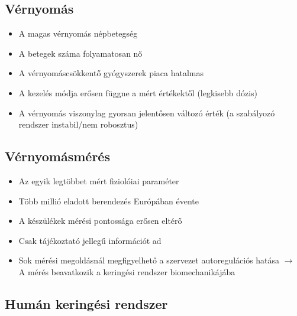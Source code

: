 \subsection{Vérnyomás}
\begin{itemize}
    \item A magas vérnyomás népbetegség
    \item A betegek száma folyamatosan nő
    \item A vérnyomáscsökkentő gyógyszerek piaca hatalmas
    \item A kezelés módja erősen függne a mért értékektől (legkisebb dózis)
    \item A vérnyomás viszonylag gyorsan jelentősen változó érték (a szabályozó rendszer instabil/nem robosztus)
\end{itemize}

\subsection{Vérnyomásmérés}
\begin{itemize}
    \item Az egyik legtöbbet mért fiziolóiai paraméter
    \item Több millió eladott berendezés Európában évente
    \item A készülékek mérési pontossága erősen eltérő
    \item Csak tájékoztató jellegű információt ad
    \item Sok mérési megoldásnál megfigyelhető a szervezet autoregulációs hatása $\rightarrow$ A mérés beavatkozik a keringési rendszer biomechanikájába
\end{itemize}

\subsection{Humán keringési rendszer}
\begin{center}
\end{center}

